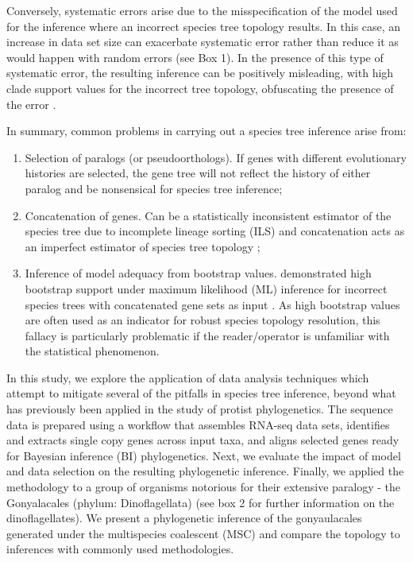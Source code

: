 \documentclass[fleqn,10pt,lineno]{wlpeerj} %
\begin{document}
Conversely, systematic errors arise due to the misspecification of the model used for the inference where an incorrect species tree topology results. 
In this case, an increase in data set size can exacerbate systematic error rather than reduce it as would happen with random errors (see Box 1). 
In the presence of this type of systematic error, the resulting inference can be positively misleading,
 with high clade support values for the incorrect tree topology, obfuscating the presence of the error \citep{jeffroy2006phylogenomics,roch2015likelihood,kubatko2007inconsistency}. 

In summary, common problems in carrying out a species tree inference arise from:\\
\begin{enumerate}[noitemsep]
\item Selection of paralogs (or pseudoorthologs). 
If genes with different evolutionary histories are selected, the gene tree will not reflect the history of either paralog and be nonsensical for species tree inference;
\item Concatenation of genes. 
Can be a statistically inconsistent estimator of the species tree due to incomplete lineage sorting (ILS) and concatenation acts as an imperfect estimator of species tree topology \citep{roch2015likelihood};
\item Inference of model adequacy from bootstrap values. 
\cite{kubatko2007inconsistency} demonstrated high bootstrap support under maximum likelihood (ML) inference for incorrect species trees with concatenated gene sets as input \citep{kubatko2007inconsistency}. 
As high bootstrap values are often used as an indicator for robust species topology resolution, this fallacy is particularly problematic if the reader/operator is unfamiliar with the statistical phenomenon.
\end{enumerate}

In this study, we explore the application of data analysis techniques which attempt to mitigate several of the pitfalls in species tree inference, beyond what has previously been applied in the study of protist phylogenetics.
The sequence data is prepared using a workflow that assembles RNA-seq data sets, identifies and extracts single copy genes across input taxa, and aligns selected genes ready for Bayesian inference (BI) phylogenetics.
Next, we evaluate the impact of model and data selection on the resulting phylogenetic inference. 
Finally, we applied the methodology to a group of organisms notorious for their extensive paralogy - the Gonyalacales (phylum: Dinoflagellata) (see box 2 for further information on the dinoflagellates).
We present a phylogenetic inference of the gonyaulacales generated under the multispecies coalescent (MSC) and compare the topology to inferences with commonly used methodologies.
\end{document}
